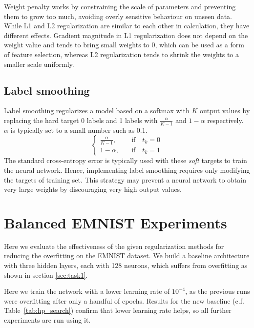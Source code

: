 \documentclass{article}
\begin{document}
Weight penalty works by constraining the scale of parameters and preventing them to grow too much, avoiding overly sensitive behaviour on unseen data.
While L1 and L2 regularization are similar to each other in calculation, they have different effects.
Gradient magnitude in L1 regularization does not depend on the weight value and tends to bring small weights to 0, which can be used as a form of feature selection, whereas L2 regularization tends to shrink the weights to a smaller scale uniformly. 


\subsection{Label smoothing}
Label smoothing regularizes a model based on a softmax with $K$ output values by replacing the hard target 0 labels and 1 labels with $\frac{\alpha}{K-1}$ and $1-\alpha$ respectively. 
$\alpha$ is typically set to a small number such as $0.1$.
\begin{equation}
    \begin{cases}
        \frac{\alpha}{K-1}, & \quad \text{if} \quad t_k=0\\
        1 - \alpha, & \quad \text{if} \quad t_k=1
    \end{cases}    
\end{equation}
The standard cross-entropy error is typically used with these \emph{soft} targets to train the neural network. 
Hence, implementing label smoothing requires only modifying the targets of training set.
This strategy may prevent a neural network to obtain very large weights by discouraging very high output values.

\section{Balanced EMNIST Experiments}

\questionTableThree

\questionFigureFour

\label{sec:task2.2}

Here we evaluate the effectiveness of the given regularization methods for reducing the overfitting on the EMNIST dataset.
We build a baseline architecture with three hidden layers, each with 128 neurons, which suffers from overfitting as shown in section \ref{sec:task1}.

Here we train the network with a lower learning rate of $10^{-4}$, as the previous runs were overfitting after only a handful of epochs. 
Results for the new baseline (c.f. Table~\ref{tab:hp_search}) confirm that lower learning rate helps, so all further experiments are run using it.
\end{document}
